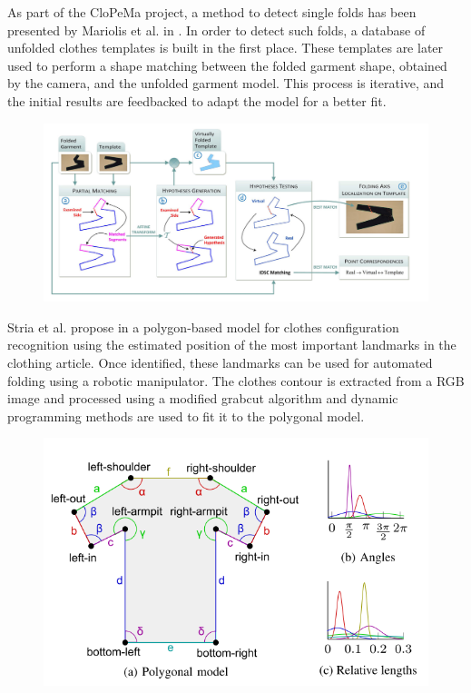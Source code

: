  As part of the CloPeMa project, a method to detect single folds has been presented by Mariolis et al. in \cite{Mariolis2013, Mariolis2015}. In order to detect such folds, a database of unfolded clothes templates is built in the first place. These templates are later used to perform a shape matching between the folded garment shape, obtained by the camera, and the unfolded garment model. This process is iterative, and the initial results are feedbacked to adapt the model for a better fit. 

\begin{figure}[thpb]
    \centering
    \includegraphics[width=\textwidth]{figures/SOTA_Mariolis_2015.png}
    \caption{}
    \label{fig:SOTA_Mariolis_2015}
\end{figure}

Stria et al. propose in \cite{Stria2014, Stria2014IROS} a polygon-based model for clothes configuration recognition using the estimated position of the most important landmarks in the clothing article. Once identified, these landmarks can be used for automated folding using a robotic manipulator. The clothes contour is extracted from a RGB image and processed using a modified grabcut algorithm and dynamic programming methods are used to fit it to the polygonal model.

\begin{figure}[thpb]
    \centering
    \includegraphics[width=\textwidth]{figures/SOTA_Stria_2014-2.png}
    \caption{}
    \label{fig:SOTA_Stria_2014}
\end{figure}


